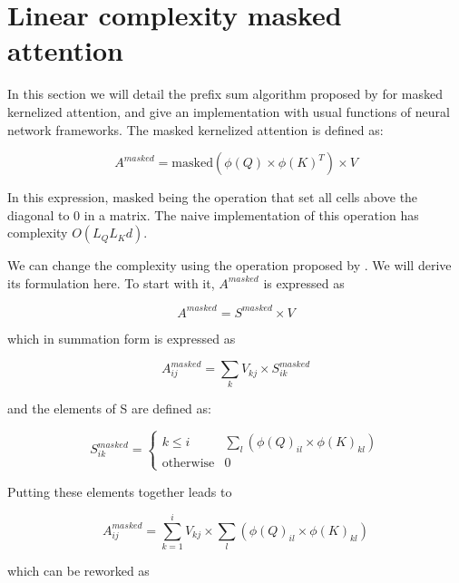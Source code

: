 \section{Linear complexity masked attention}

In this section we will detail the prefix sum algorithm proposed by
\citet{choromanski2021rethinking} for
 masked kernelized attention, and give an implementation with usual
functions of neural network frameworks. The masked kernelized attention is defined as:

\begin{equation}
A^{masked} = \mathrm{masked} \left( \phi(Q) \times \phi(K)^T \right) \times V
\end{equation}

In this expression, $\mathrm{masked}$ being the operation that set all cells
 above the diagonal to 0 in a matrix. The naive implementation of this
 operation has complexity $O(L_QL_Kd)$.

We can change the complexity using the operation proposed by
 \citet{choromanski2021rethinking}. We
 will derive its formulation here.
 To start with it, $A^{masked}$ is expressed as

\begin{equation}
A^{masked} = S^{masked} \times V
\end{equation}

\noindent{}which
in summation form is expressed as

\begin{equation}
A^{masked}_{ij} = \sum_k V_{kj} \times S^{masked}_{ik}
\end{equation}

\noindent{}and the
elements of S are defined as:

\begin{equation}
S^{masked}_{ik} =
\begin{cases}
k \leq i & \sum_l \left( \phi(Q)_{il} \times \phi(K)_{kl} \right) \\
\text{otherwise} &{}0 
\end{cases}
\end{equation}

Putting these elements together leads to

\begin{equation}
A^{masked}_{ij}= \sum_{k=1}^i V_{kj} \times \sum_l \left( \phi(Q)_{il} \times \phi(K)_{kl} \right)
\end{equation}

\noindent{}which can be reworked as

